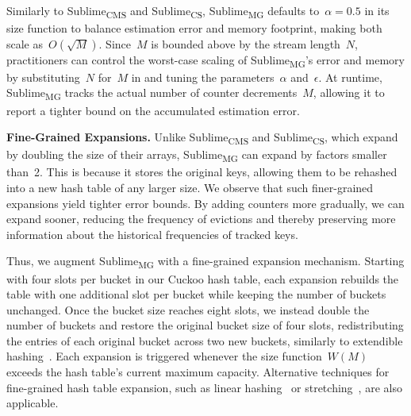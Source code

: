 \documentclass[sigconf]{acmart}
\newcommand{\sketch}{Sublime}
\newcommand{\sketchcms}{\sketch\textsubscript{CMS}\xspace}
\newcommand{\sketchcs}{\sketch\textsubscript{CS}\xspace}
\newcommand{\sketchmg}{\sketch\textsubscript{MG}\xspace}
\begin{document}
Similarly to \sketchcms and \sketchcs, \sketchmg defaults to~$\alpha=0.5$ in its size function to balance estimation error and memory footprint, making both scale as~$O(\sqrt{M})$.
Since~$M$ is bounded above by the stream length~$N$, practitioners can control the worst-case scaling of \sketchmg's error and memory by substituting~$N$ for~$M$ in  and tuning the parameters~$\alpha$ and~$\epsilon$.
At runtime, \sketchmg tracks the actual number of counter decrements~$M$, allowing it to report a tighter bound on the accumulated estimation error.

\textbf{Fine-Grained Expansions.}
Unlike \sketchcms and \sketchcs, which expand by doubling the size of their arrays, \sketchmg can expand by factors smaller than~2.
This is because it stores the original keys, allowing them to be rehashed into a new hash table of any larger size.
We observe that such finer-grained expansions yield tighter error bounds.
By adding counters more gradually, we can expand sooner, reducing the frequency of evictions and thereby preserving more information about the historical frequencies of tracked keys.

Thus, we augment \sketchmg with a fine-grained expansion mechanism.
Starting with four slots per bucket in our Cuckoo hash table, each expansion rebuilds the table with one additional slot per bucket while keeping the number of buckets unchanged.
Once the bucket size reaches eight slots, we instead double the number of buckets and restore the original bucket size of four slots, redistributing the entries of each original bucket across two new buckets, similarly to extendible hashing~\cite{ExtendibleHashing}.
Each expansion is triggered whenever the size function~$W(M)$ exceeds the hash table's current maximum capacity.
Alternative techniques for fine-grained hash table expansion, such as linear hashing~\cite{LinearHashing,VirtualHashing} or stretching~\cite{Zeno}, are also applicable.
\end{document}

